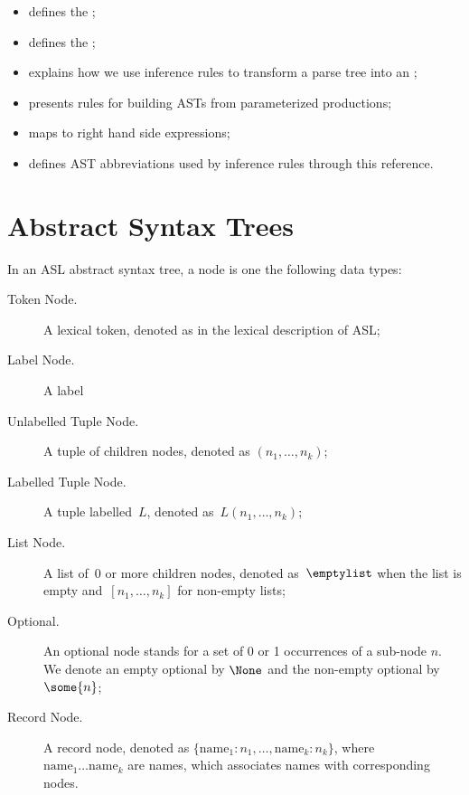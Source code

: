 \begin{itemize}
\begin{itemize}
  \end{itemize}
  \item {} defines the \untypedast;
  \item {} defines the \typedast;
  \item {} explains how we use inference rules to transform a parse tree into an \untypedast;
  \item {} presents rules for building ASTs from parameterized productions;
  \item {} maps \assignableexpressions{} to right hand side expressions;
  \item {} defines AST abbreviations used by inference rules through this reference.
\end{itemize}

\section{Abstract Syntax Trees\label{sec:AbstractSyntaxTrees}}

In an ASL abstract syntax tree, a node is one the following data types:
\begin{description}
\item[Token Node.] A lexical token, denoted as in the lexical description of ASL;
\item[Label Node.] A label
\item[Unlabelled Tuple Node.] A tuple of children nodes, denoted as $(n_1,\ldots,n_k)$;
\item[Labelled Tuple Node.] A tuple labelled~$L$, denoted as~$L(n_1,\ldots,n_k)$;
\item[List Node.] A list of~$0$ or more children nodes, denoted as~$\emptylist$
      when the list is empty and~$[n_1,\ldots,n_k]$ for non-empty lists;
\item[Optional.] An optional node stands for a set of 0 or 1 occurrences of a sub-node $n$.
      We denote an empty optional by $\None$ and the non-empty optional by $\some{n}$;
\item[Record Node.] A record node, denoted as $\{\text{name}_1 : n_1,\ldots,\text{name}_k : n_k\}$, where \\
      $\text{name}_1 \ldots \text{name}_k$ are names, which associates names with corresponding nodes.
\end{description}

